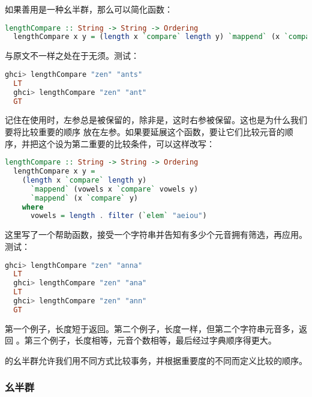 \documentclass[./main.tex]{subfiles}
\begin{document}
如果善用是一种幺半群，那么可以简化函数：

\begin{lstlisting}[language=Haskell]
  lengthCompare :: String -> String -> Ordering
  lengthCompare x y = (length x `compare` length y) `mappend` (x `compare` y)
\end{lstlisting}

与原文不一样之处在于无须。测试：

\begin{lstlisting}[language=Haskell]
  ghci> lengthCompare "zen" "ants"
  LT
  ghci> lengthCompare "zen" "ant"
  GT
\end{lstlisting}

记住在使用时，左参总是被保留的，除非是，这时右参被保留。这也是为什么我们要将比较重要的顺序
放在左参。如果要延展这个函数，要让它们比较元音的顺序，并把这个设为第二重要的比较条件，可以这样改写：

\begin{lstlisting}[language=Haskell]
  lengthCompare :: String -> String -> Ordering
  lengthCompare x y =
    (length x `compare` length y)
      `mappend` (vowels x `compare` vowels y)
      `mappend` (x `compare` y)
    where
      vowels = length . filter (`elem` "aeiou")
\end{lstlisting}

这里写了一个帮助函数，接受一个字符串并告知有多少个元音拥有筛选，再应用。测试：

\begin{lstlisting}[language=Haskell]
  ghci> lengthCompare "zen" "anna"
  LT
  ghci> lengthCompare "zen" "ana"
  LT
  ghci> lengthCompare "zen" "ann"
  GT
\end{lstlisting}

第一个例子，长度短于返回。第二个例子，长度一样，但第二个字符串元音多，返回
。第三个例子，长度相等，元音个数相等，最后经过字典顺序得更大。

的幺半群允许我们用不同方式比较事务，并根据重要度的不同而定义比较的顺序。

\subsubsection*{幺半群}



\end{document}
